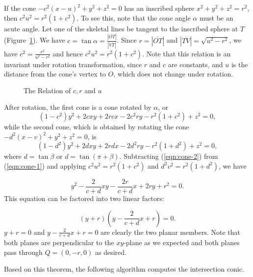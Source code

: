      If the cone $-c^2(x-u)^2+y^2+z^2=0$ has an inscribed sphere
$x^2+y^2+z^2=r^2$, then $c^2u^2=r^2(1+c^2)$.  To see this, note that the cone
angle $\alpha$ must be an acute angle.  Let one of the skeletal lines be
tangent to the inscribed sphere at $T$ (Figure~\ref{fig:relation-of-cru}).
We have $c=\tan\alpha=\frac{|\overline{OT}|}{|\overline{VT}|}$.  Since
$r=|\overline{OT}|$ and $|\overline{TV}|=\sqrt{u^2-r^2}$, we have
$c^2=\frac{r^2}{u^2-r^2}$ and hence $c^2u^2=r^2(1+c^2)$.
Note that this relation is an invariant under rotation transformation, since
$r$ and $c$ are constants, and $u$ is the distance from the cone's vertex to
$O$, which does not change under rotation.
\begin{figure}
\vspace{4.5cm}
\caption{The Relation of $c, r$ and $u$}
\label{fig:relation-of-cru}
\end{figure}

     After rotation, the first cone is a  cone rotated by $\alpha$, or
\begin{equation}
\label{eqn:cone-1}
     (1-c^2)y^2+2cxy+2rcx-2c^2ry-r^2(1+c^2)+z^2=0,
\end{equation}
while the second cone, which is obtained by rotating the  cone
$-d^2(x-v)^2+y^2+z^2=0$, is
\begin{equation}
\label{eqn:cone-2}
     (1-d^2)y^2+2dxy+2rdx-2d^2ry-r^2(1+d^2)+z^2=0,
\end{equation}
where $d=\tan\beta$ or $d=\tan(\pi+\beta)$.
Subtracting (\ref{eqn:cone-2}) from (\ref{eqn:cone-1}) and applying
$c^2u^2=r^2(1+c^2)$ and $d^2v^2=r^2(1+d^2)$, we have

\[ y^2-\frac{2}{c+d}xy-\frac{2r}{c+d}x+2ry+r^2=0. \]
This equation can be factored into two linear factors:

\[ \left(y+r\right)\left(y-\frac{2}{c+d}x+r\right)=0. \]
$y+r=0$ and $y-\frac{2}{c+d}x+r=0$ are clearly the two planar members.
Note that both planes are perpendicular to the $xy$-plane as we expected and
both planes pass through $Q=(0,-r,0)$ as desired. \QED

     Based on this theorem, the following algorithm computes the
intersection conic.

